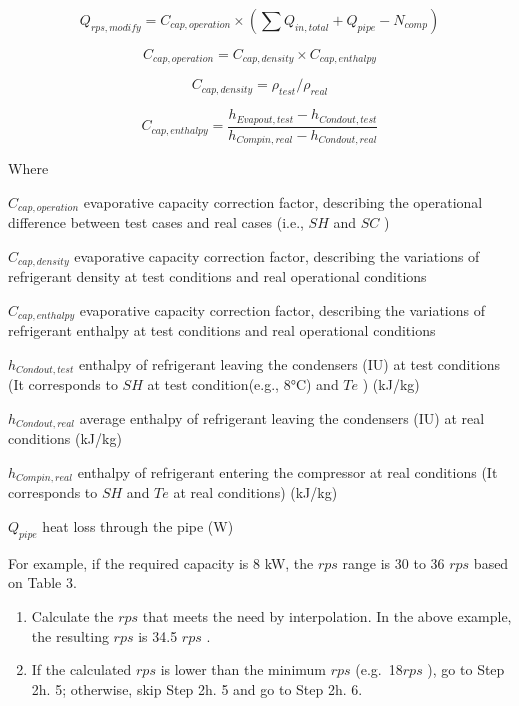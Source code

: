 \begin{equation}
Q_{rps,modify} = C_{cap,operation}\times(\sum{Q_{in,total}}+Q_{pipe}-N_{comp})
\end{equation}

\begin{equation}
C_{cap,operation} = C_{cap,density}\times{C_{cap,enthalpy}}
\end{equation}

\begin{equation}
C_{cap,density} = \rho_{test}/\rho_{real}
\end{equation}

\begin{equation}
C_{cap,enthalpy} = \frac{h_{Evapout,test}-h_{Condout,test}}{h_{Compin,real}-h_{Condout,real}}
\end{equation}

Where

\(C_{cap,operation}\) evaporative capacity correction factor, describing the operational difference between test cases and real cases (i.e., \(SH\) and \(SC\) )

\(C_{cap,density}\) evaporative capacity correction factor, describing the variations of refrigerant density at test conditions and real operational conditions

\(C_{cap,enthalpy}\) evaporative capacity correction factor, describing the variations of refrigerant enthalpy at test conditions and real operational conditions

\(h_{Condout,test}\) enthalpy of refrigerant leaving the condensers (IU) at test conditions (It corresponds to \(SH\) at test condition(e.g., 8°C) and \(Te\) ) (kJ/kg)

\(h_{Condout,real}\) average enthalpy of refrigerant leaving the condensers (IU) at real conditions (kJ/kg)

\(h_{Compin,real}\) enthalpy of refrigerant entering the compressor at real conditions (It corresponds to \(SH\) and \(Te\) at real conditions) (kJ/kg)

\(Q_{pipe}\) heat loss through the pipe (W)

For example, if the required capacity is 8 kW, the \(rps\) range is 30 to 36 \(rps\) based on Table 3.

\begin{enumerate}
\def\labelenumi{\alph{enumi}.}
\setcounter{enumi}{2}
\item
  Calculate the \(rps\) that meets the need by interpolation. In the above example, the resulting \(rps\) is 34.5 \(rps\) .
\item
  If the calculated \(rps\) is lower than the minimum \(rps\) (e.g.~18\(rps\) ), go to Step 2h. 5; otherwise, skip Step 2h. 5 and go to Step 2h. 6.
\end{enumerate}

